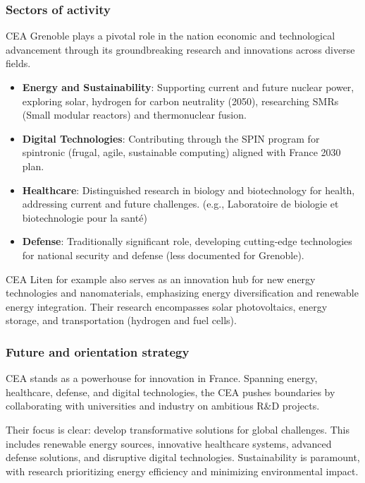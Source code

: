 \subsubsection{Sectors of activity}

CEA Grenoble plays a pivotal role in the nation economic and technological 
advancement through its groundbreaking research and innovations across diverse fields.

\begin{itemize}
  \item \textbf{Energy and Sustainability}: Supporting current and future nuclear power, exploring solar, hydrogen for carbon
  neutrality (2050), researching SMRs (Small modular reactors) and thermonuclear fusion.
  \item \textbf{Digital Technologies}: Contributing through the SPIN program for spintronic (frugal, agile, sustainable computing)
  aligned with France 2030 plan.
  \item \textbf{Healthcare}: Distinguished research in biology and biotechnology for health, addressing current and future challenges.
  (e.g., Laboratoire de biologie et biotechnologie pour la santé)
  \item \textbf{Defense}: Traditionally significant role, developing cutting-edge technologies for national security and defense 
  (less documented for Grenoble).
\end{itemize}

CEA Liten for example also serves as an innovation hub for new energy technologies and nanomaterials, emphasizing energy diversification
 and renewable energy integration. Their research encompasses solar photovoltaics, energy storage, and transportation (hydrogen and fuel
 cells).


\subsubsection{Future and orientation strategy}

\medskip

 CEA stands as a powerhouse for innovation in France.
 Spanning energy, healthcare, defense, and digital technologies, the CEA pushes boundaries by collaborating with universities
 and industry on ambitious R\&D projects.

\medskip

Their focus is clear: develop transformative solutions for global challenges. 
 This includes renewable energy sources, innovative healthcare systems, advanced defense solutions, 
 and disruptive digital technologies. Sustainability is paramount, with research prioritizing energy 
 efficiency and minimizing environmental impact.

